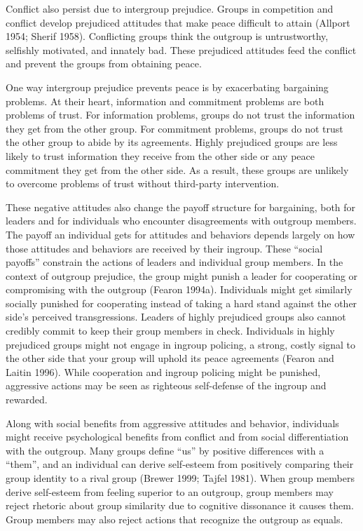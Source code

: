 \documentclass[11pt]{article}
\begin{document}
Conflict also persist due to intergroup prejudice. Groups in competition
and conflict develop prejudiced attitudes that make peace difficult to
attain (Allport 1954; Sherif 1958). Conflicting groups think the
outgroup is untrustworthy, selfishly motivated, and innately bad. These
prejudiced attitudes feed the conflict and prevent the groups from
obtaining peace.

One way intergroup prejudice prevents peace is by exacerbating
bargaining problems. At their heart, information and commitment problems
are both problems of trust. For information problems, groups do not
trust the information they get from the other group. For commitment
problems, groups do not trust the other group to abide by its
agreements. Highly prejudiced groups are less likely to trust
information they receive from the other side or any peace commitment
they get from the other side. As a result, these groups are unlikely to
overcome problems of trust without third-party intervention.

These negative attitudes also change the payoff structure for
bargaining, both for leaders and for individuals who encounter
disagreements with outgroup members. The payoff an individual gets for
attitudes and behaviors depends largely on how those attitudes and
behaviors are received by their ingroup. These ``social payoffs''
constrain the actions of leaders and individual group members. In the
context of outgroup prejudice, the group might punish a leader for
cooperating or compromising with the outgroup (Fearon 1994a).
Individuals might get similarly socially punished for cooperating
instead of taking a hard stand against the other side's perceived
transgressions. Leaders of highly prejudiced groups also cannot credibly
commit to keep their group members in check. Individuals in highly
prejudiced groups might not engage in ingroup policing, a strong, costly
signal to the other side that your group will uphold its peace
agreements (Fearon and Laitin 1996). While cooperation and ingroup
policing might be punished, aggressive actions may be seen as righteous
self-defense of the ingroup and rewarded.

Along with social benefits from aggressive attitudes and behavior,
individuals might receive psychological benefits from conflict and from
social differentiation with the outgroup. Many groups define ``us'' by
positive differences with a ``them'', and an individual can derive
self-esteem from positively comparing their group identity to a rival
group (Brewer 1999; Tajfel 1981). When group members derive self-esteem
from feeling superior to an outgroup, group members may reject rhetoric
about group similarity due to cognitive dissonance it causes them. Group
members may also reject actions that recognize the outgroup as equals.
\end{document}
